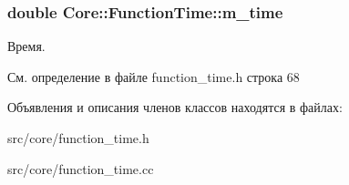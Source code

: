 \subsubsection[{\texorpdfstring{m\+\_\+time}{m_time}}]{\setlength{\rightskip}{0pt plus 5cm}double Core\+::\+Function\+Time\+::m\+\_\+time\hspace{0.3cm}{\ttfamily [protected]}}\hypertarget{class_core_1_1_function_time_a12192d0047976f9cd6376e986e43451c}{}\label{class_core_1_1_function_time_a12192d0047976f9cd6376e986e43451c}
Время. 

См. определение в файле function\+\_\+time.\+h строка 68



Объявления и описания членов классов находятся в файлах\+:\begin{DoxyCompactItemize}
\item 
src/core/function\+\_\+time.\+h\item 
src/core/function\+\_\+time.\+cc\end{DoxyCompactItemize}

